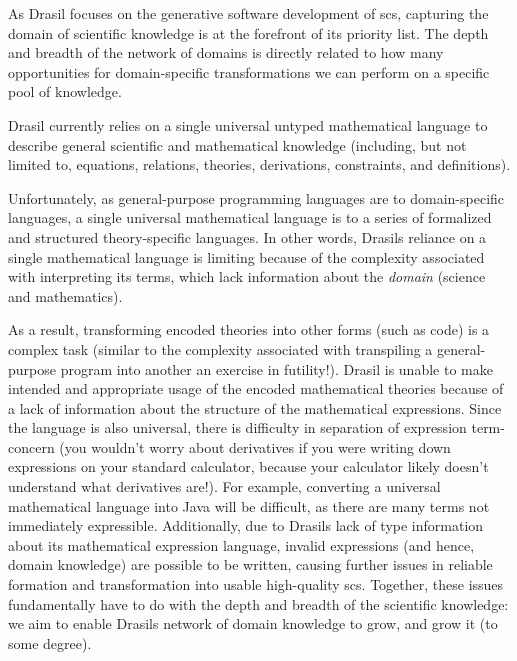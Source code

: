 \roughNetworkOfDomains{}

As Drasil focuses on the generative software development of \acs{scs}, capturing
the domain of scientific knowledge is at the forefront of its priority list. The
depth and breadth of the network of domains is directly related to how many
opportunities for domain-specific transformations we can perform on a specific
pool of knowledge.

Drasil currently relies on a single universal untyped mathematical language to
describe general scientific and mathematical knowledge (including, but not
limited to, equations, relations, theories, derivations, constraints, and
definitions).


Unfortunately, as general-purpose programming languages are to domain-specific
languages, a single universal mathematical language is to a series of formalized
and structured theory-specific languages. In other words, Drasils reliance on a
single mathematical language is limiting because of the complexity associated
with interpreting its terms, which lack information about the \textit{domain}
(science and mathematics).

As a result, transforming encoded theories into other forms (such as code) is a
complex task (similar to the complexity associated with transpiling a
general-purpose program into another \textemdash{} an exercise in futility!). Drasil is
unable to make intended and appropriate usage of the encoded mathematical
theories because of a lack of information about the structure of the
mathematical expressions. Since the language is also universal, there is
difficulty in separation of expression term-concern (you wouldn't worry about
derivatives if you were writing down expressions on your standard calculator,
because your calculator likely doesn't understand what derivatives are!). For
example, converting a universal mathematical language into Java will be
difficult, as there are many terms not immediately expressible. Additionally,
due to Drasils lack of type information about its mathematical expression
language, invalid expressions (and hence, domain knowledge) are possible to be
written, causing further issues in reliable formation and transformation into
usable high-quality \acs{scs}. Together, these issues fundamentally have to do
with the depth and breadth of the scientific knowledge: we aim to enable Drasils
network of domain knowledge to grow, and grow it (to some degree).

